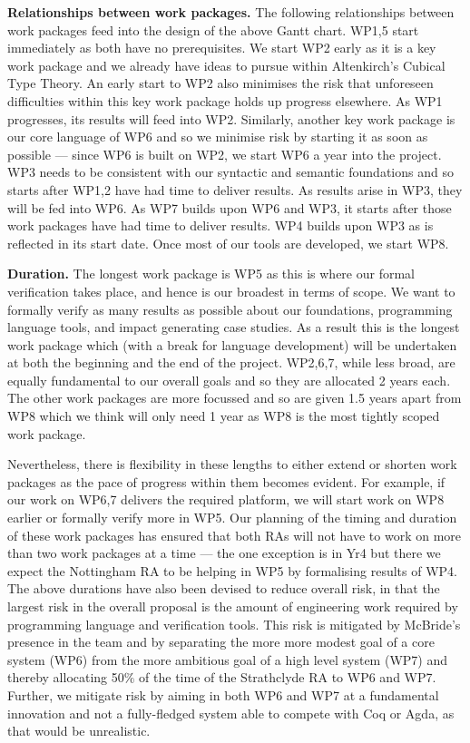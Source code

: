 \documentclass[a4paper,11pt]{article}
\begin{document}
\bigskip

{\bf Relationships between work packages.} The following 
relationships between work packages feed into the design of the above
Gantt chart. WP1,5 start immediately as both have no prerequisites. We
start WP2 early as it is a key work package and we already have
ideas to pursue within Altenkirch's Cubical Type Theory. An early
start to WP2 also minimises the risk that unforeseen difficulties
within this key work package holds up progress elsewhere. As WP1
progresses, its results will feed into WP2. Similarly, another key
work package is our core language of WP6 and so we minimise risk by
starting it as soon as possible --- since WP6 is built on WP2, we
start WP6 a year into the project. WP3 needs to be consistent with our
syntactic and semantic foundations and so starts after WP1,2 have had
time to deliver results. As results arise in WP3, they will be fed
into WP6. As WP7 builds upon WP6 and WP3, it starts after those work
packages have had time to deliver results. WP4 builds upon WP3 as is
reflected in its start date. Once most of our tools are
developed, we start WP8.

{\bf Duration.} The longest work package is WP5 as this is where our
formal verification takes place, and hence is our broadest in terms of
scope. We want to formally verify as many results as possible about
our foundations, programming language tools, and impact generating
case studies.  As a result this is the longest work package which
(with a break for language development) will be undertaken at both the
beginning and the end of the project. WP2,6,7, while less broad, are
equally fundamental to our overall goals and so they are allocated 2
years each. The other work packages are more focussed and
so are given 1.5 years apart from WP8 which we think will only need 1
year as WP8 is the most tightly scoped work package.

Nevertheless, there is flexibility in these lengths to either extend
or shorten work packages as the pace of progress within them becomes
evident. For example, if our work on WP6,7 delivers the required
platform, we will start work on WP8 earlier or formally verify more in
WP5.  Our planning of the timing and duration of these work packages
has ensured that both RAs will not have to work on more than two work
packages at a time --- the one exception is in Yr4 but
there we expect the Nottingham RA to be helping in WP5 by formalising
results of WP4. The above durations have also been
devised to reduce overall risk, in that the largest risk in the
overall proposal is the amount of engineering work required by
programming language and verification tools. This risk is mitigated by
McBride's presence in the team and by separating the
more more modest goal of a core system (WP6) from the more ambitious
goal of a high level system (WP7) and thereby allocating 50$\%$ of the
time of the Strathclyde RA to WP6 and WP7. Further, we mitigate risk 
by aiming in both WP6 and WP7 at a fundamental innovation and not a
fully-fledged system able to compete with Coq or Agda, as that would
be unrealistic.
\end{document}
